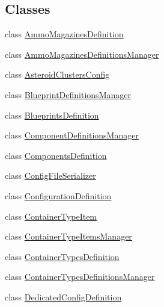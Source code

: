 \subsection*{Classes}
\begin{DoxyCompactItemize}
\item 
class \hyperlink{class_s_e_mod_a_p_i_1_1_a_p_i_1_1_definitions_1_1_ammo_magazines_definition}{Ammo\+Magazines\+Definition}
\item 
class \hyperlink{class_s_e_mod_a_p_i_1_1_a_p_i_1_1_definitions_1_1_ammo_magazines_definitions_manager}{Ammo\+Magazines\+Definitions\+Manager}
\item 
class \hyperlink{class_s_e_mod_a_p_i_1_1_a_p_i_1_1_definitions_1_1_asteroid_clusters_config}{Asteroid\+Clusters\+Config}
\item 
class \hyperlink{class_s_e_mod_a_p_i_1_1_a_p_i_1_1_definitions_1_1_blueprint_definitions_manager}{Blueprint\+Definitions\+Manager}
\item 
class \hyperlink{class_s_e_mod_a_p_i_1_1_a_p_i_1_1_definitions_1_1_blueprints_definition}{Blueprints\+Definition}
\item 
class \hyperlink{class_s_e_mod_a_p_i_1_1_a_p_i_1_1_definitions_1_1_component_definitions_manager}{Component\+Definitions\+Manager}
\item 
class \hyperlink{class_s_e_mod_a_p_i_1_1_a_p_i_1_1_definitions_1_1_components_definition}{Components\+Definition}
\item 
class \hyperlink{class_s_e_mod_a_p_i_1_1_a_p_i_1_1_definitions_1_1_config_file_serializer}{Config\+File\+Serializer}
\item 
class \hyperlink{class_s_e_mod_a_p_i_1_1_a_p_i_1_1_definitions_1_1_configuration_definition}{Configuration\+Definition}
\item 
class \hyperlink{class_s_e_mod_a_p_i_1_1_a_p_i_1_1_definitions_1_1_container_type_item}{Container\+Type\+Item}
\item 
class \hyperlink{class_s_e_mod_a_p_i_1_1_a_p_i_1_1_definitions_1_1_container_type_items_manager}{Container\+Type\+Items\+Manager}
\item 
class \hyperlink{class_s_e_mod_a_p_i_1_1_a_p_i_1_1_definitions_1_1_container_types_definition}{Container\+Types\+Definition}
\item 
class \hyperlink{class_s_e_mod_a_p_i_1_1_a_p_i_1_1_definitions_1_1_container_types_definitions_manager}{Container\+Types\+Definitions\+Manager}
\item 
class \hyperlink{class_s_e_mod_a_p_i_1_1_a_p_i_1_1_definitions_1_1_dedicated_config_definition}{Dedicated\+Config\+Definition}

\end{DoxyCompactItemize}
